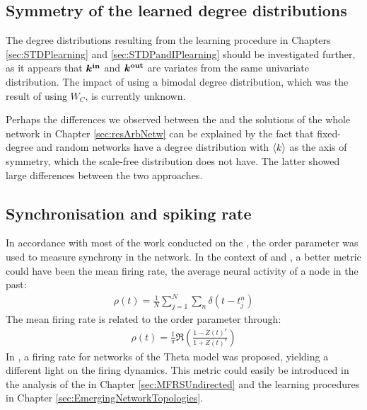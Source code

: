 \subsection{Symmetry of the learned degree distributions}
The degree distributions resulting from the learning procedure in Chapters \ref{sec:STDPlearning} and \ref{sec:STDPandIPlearning} should be investigated further, as it appears that ${\boldsymbol{k^{\rm in}}}$ and $\boldsymbol{{k^{\rm out}}}$ are variates from the same univariate distribution. The impact of using a bimodal degree distribution, which was the result of using $W_C$, is currently unknown.

Perhaps the differences we observed between the \MFR and the solutions of the whole network in Chapter \ref{sec:resArbNetw} can be explained by the fact that fixed-degree and random networks have a degree distribution with ${\langle k\rangle}$ as the axis of symmetry, which the scale-free distribution does not have. The latter showed large differences between the two approaches.


\subsection{Synchronisation and spiking rate}
In accordance with most of the work conducted on the \MFR, the order parameter was used to measure synchrony in the network. In the context of \STDP and \IP, a better metric could have been the mean firing rate, the average neural activity of a node in the past:
\begin{align}
\rho(t)=\frac{1}{N} \sum_{j=1}^{N} \sum_{n} \delta\left(t-t_{j}^{n}\right)
\end{align}
The mean firing rate is related to the order parameter through:
\begin{align}
\rho(t) = \frac{1}{\pi} \Re \left(\frac{1-Z(t)^c}{1+Z(t)^c}\right)
\end{align}
In \cite{Montbrio2015}, a firing rate \MFR for networks of the Theta model was proposed, yielding a different light on the firing dynamics. This metric could easily be introduced in the analysis of the \MFR in Chapter \ref{sec:MFRSUndirected} and the learning procedures in Chapter \ref{sec:EmergingNetworkTopologies}.




